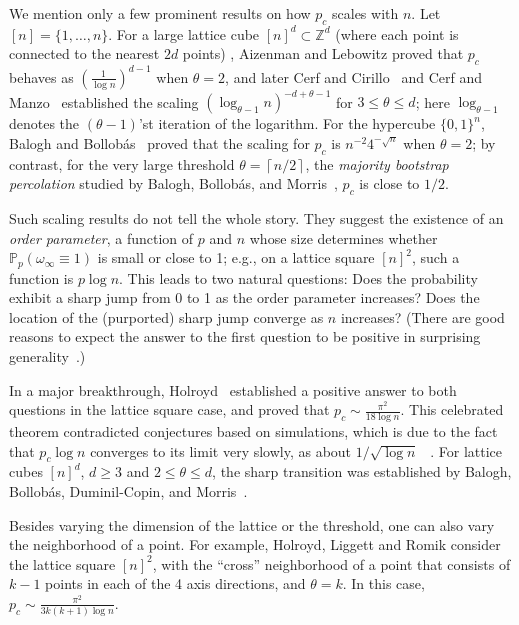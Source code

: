 \documentclass{amsart}
\newcommand{\ceil}[1]{\left\lceil#1\right \rceil}
\newcommand{\prob}{\mathbb{P}}
\newcommand{\threshold}{\theta}
\numberwithin{equation}{section}
\theoremstyle{definition}
\theoremstyle{remark}
\begin{document}
We mention only a few prominent results on how $p_c$ scales with $n$. Let $[n]=\{1,\dots,n\}$. For a large lattice cube $[n]^d\subset \mathbb{Z}^d$
(where each point is connected to the nearest $2d$ points) , Aizenman and Lebowitz \cite{aizenman} proved that $p_c$ behaves as $(\frac{1}{\log n})^{d-1}$ when $\threshold=2$, and later Cerf and Cirillo~\cite{cerfcirillo} and Cerf and Manzo~\cite{cerfmanzo} established the scaling $(\log_{\threshold-1} n)^{-d+\threshold-1}$ for $3\le \theta\le d$; here $\log_{\threshold-1}$ denotes the $(\theta-1)$'st iteration of the logarithm. For the hypercube $\{0,1\}^n$,
 Balogh and Bollob\'as~\cite{BB:2006} proved that the scaling 
for $p_c$ is $n^{-2}4^{-\sqrt n}$ when $\threshold=2$; by contrast,  for the very large threshold 
 $\threshold=\ceil{n/2}$, the {\it majority bootstrap percolation\/} studied by  Balogh, Bollob\'as, and Morris~\cite{bollobas}, 
$p_c$ is close to $1/2$.

Such scaling results do not tell the whole story. They suggest the existence of an {\it order parameter\/}, a function of $p$ and $n$ whose size determines whether $\prob_{p}(\omega_\infty\equiv1)$ is small or close to 1; e.g., on a lattice square $[n]^2$, such a function is $p\log n$. This leads to two natural questions: Does the probability exhibit a sharp jump from 0 to 1 as the order parameter increases? Does the location of the (purported) sharp jump converge as $n$ increases? (There are good reasons to expect the answer to the first question to be positive in surprising generality~\cite{FK:1996}.)

In a major breakthrough, Holroyd~\cite{holroyd} established a positive answer to both questions
in the lattice square case, and proved that $p_c\sim \frac{\pi^2}{18 \log n}$. This celebrated theorem contradicted conjectures based on simulations, which is due to the fact that $p_c\log n$ converges to its limit very slowly, as about $1/\sqrt{\log n}$
~\cite{GGM:2012}. For lattice cubes $[n]^d$, $d\ge 3$ and $2\le \theta\le d$, the sharp transition was established by Balogh, Bollob\'as, Duminil-Copin, and Morris~\cite{bollobas1, bollobas2}.

Besides varying the dimension of the lattice or the threshold, one can also vary the  neighborhood of a point. For example, Holroyd, Liggett and Romik \cite{hlr} consider the lattice square $[n]^2$, with the ``cross'' neighborhood of a point that consists of $k-1$ points in each of the 4 axis directions, and $\threshold=k$. In this case, $p_c\sim\frac{\pi^2}{3k(k+1) \log n}$.
\end{document}
